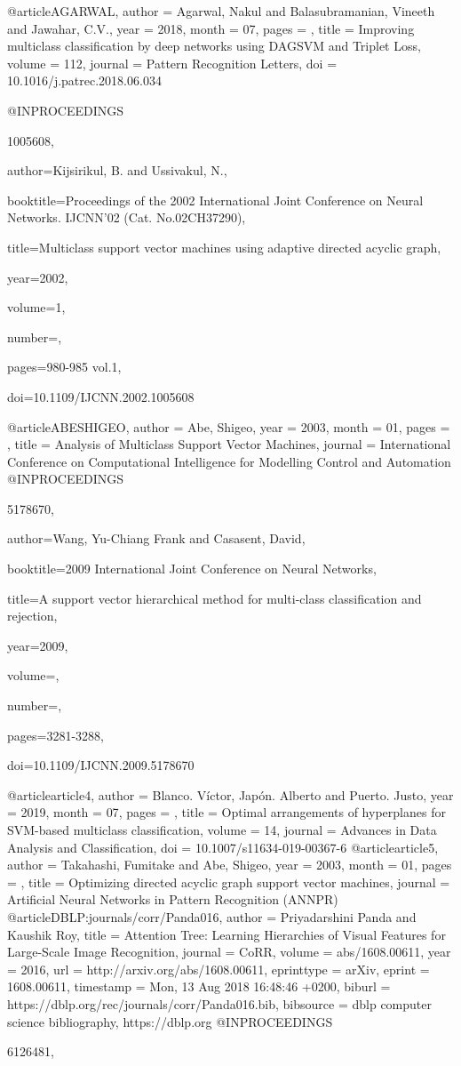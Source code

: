 \begin{thebibliography}{widestlabel}
@article{AGARWAL,
	author = {Agarwal, Nakul and Balasubramanian, Vineeth and Jawahar, C.V.},
	year = {2018},
	month = {07},
	pages = {},
	title = {Improving multiclass classification by deep networks using DAGSVM and Triplet Loss},
	volume = {112},
	journal = {Pattern Recognition Letters},
	doi = {10.1016/j.patrec.2018.06.034}
}

@INPROCEEDINGS{1005608,
	
	author={Kijsirikul, B. and Ussivakul, N.},
	
	booktitle={Proceedings of the 2002 International Joint Conference on Neural Networks. IJCNN'02 (Cat. No.02CH37290)}, 
	
	title={Multiclass support vector machines using adaptive directed acyclic graph}, 
	
	year={2002},
	
	volume={1},
	
	number={},
	
	pages={980-985 vol.1},
	
	doi={10.1109/IJCNN.2002.1005608}}

@article{ABESHIGEO,
	author = {Abe, Shigeo},
	year = {2003},
	month = {01},
	pages = {},
	title = {Analysis of Multiclass Support Vector Machines},
	journal = {International Conference on Computational Intelligence for Modelling Control and Automation}
}
@INPROCEEDINGS{5178670,
	
	author={Wang, Yu-Chiang Frank and Casasent, David},
	
	booktitle={2009 International Joint Conference on Neural Networks}, 
	
	title={A support vector hierarchical method for multi-class classification and rejection}, 
	
	year={2009},
	
	volume={},
	
	number={},
	
	pages={3281-3288},
	
	doi={10.1109/IJCNN.2009.5178670}}

@article{article4,
	author = {Blanco. V\'ictor, Jap\'on. Alberto and Puerto. Justo},
	year = {2019},
	month = {07},
	pages = {},
	title = {Optimal arrangements of hyperplanes for SVM-based multiclass classification},
	volume = {14},
	journal = {Advances in Data Analysis and Classification},
	doi = {10.1007/s11634-019-00367-6}
}
@article{article5,
	author = {Takahashi, Fumitake and Abe, Shigeo},
	year = {2003},
	month = {01},
	pages = {},
	title = {Optimizing directed acyclic graph support vector machines},
	journal = {Artificial Neural Networks in Pattern Recognition (ANNPR)}
}
@article{DBLP:journals/corr/Panda016,
	author    = {Priyadarshini Panda and
	Kaushik Roy},
	title     = {Attention Tree: Learning Hierarchies of Visual Features for Large-Scale
	Image Recognition},
	journal   = {CoRR},
	volume    = {abs/1608.00611},
	year      = {2016},
	url       = {http://arxiv.org/abs/1608.00611},
	eprinttype = {arXiv},
	eprint    = {1608.00611},
	timestamp = {Mon, 13 Aug 2018 16:48:46 +0200},
	biburl    = {https://dblp.org/rec/journals/corr/Panda016.bib},
	bibsource = {dblp computer science bibliography, https://dblp.org}
}
@INPROCEEDINGS{6126481,
	
}
\end{thebibliography}
